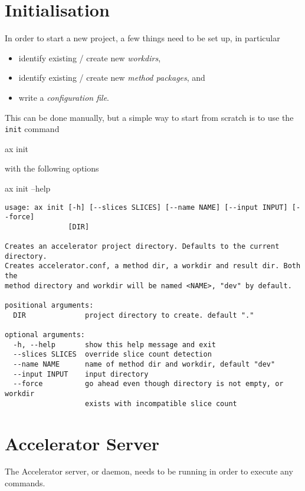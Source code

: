 \section{Initialisation}
\label{sec:initialisation}
In order to start a new project, a few things need to be set up, in
particular
\begin{itemize}
\item[] identify existing / create new \textsl{workdirs},
\item[] identify existing / create new \textsl{method packages}, and
\item[] write a \textsl{configuration file}.
\end{itemize}
This can be done manually, but a simple way to start from scratch is
to use the \texttt{init} command
\begin{shell}
  ax init
\end{shell}
with the following options
\begin{shell}
  ax init --help
\end{shell}
\begin{snugshade}
\begin{verbatim}
usage: ax init [-h] [--slices SLICES] [--name NAME] [--input INPUT] [--force]
               [DIR]

Creates an accelerator project directory. Defaults to the current directory.
Creates accelerator.conf, a method dir, a workdir and result dir. Both the
method directory and workdir will be named <NAME>, "dev" by default.

positional arguments:
  DIR              project directory to create. default "."

optional arguments:
  -h, --help       show this help message and exit
  --slices SLICES  override slice count detection
  --name NAME      name of method dir and workdir, default "dev"
  --input INPUT    input directory
  --force          go ahead even though directory is not empty, or workdir
                   exists with incompatible slice count
\end{verbatim}
\end{snugshade}



\section{Accelerator Server}

The Accelerator server, or daemon, needs to be running in order to
execute any commands.

